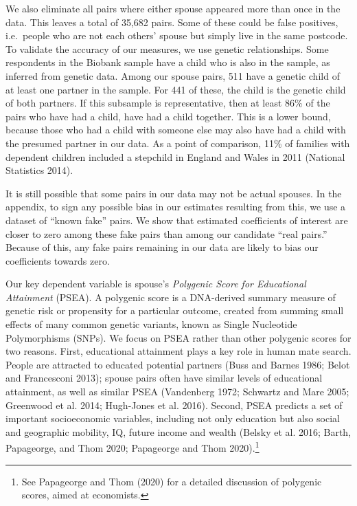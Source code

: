 \documentclass[
]{article}
\begin{document}
We also eliminate all pairs where either spouse appeared more than once
in the data. This leaves a total of 35,682 pairs. Some of
these could be false positives, i.e.~people who are not each others'
spouse but simply live in the same postcode. To validate the accuracy of
our measures, we use genetic relationships. Some respondents in the
Biobank sample have a child who is also in the sample, as inferred from
genetic data. Among our spouse pairs, 511 have a genetic
child of at least one partner in the sample. For 441 of
these, the child is the genetic child of both partners. If this
subsample is representative, then at least
86\% of the pairs who have had a
child, have had a child together. This is a lower bound, because those
who had a child with someone else may also have had a child with the
presumed partner in our data. As a point of comparison, 11\% of families
with dependent children included a stepchild in England and Wales in
2011 (National Statistics 2014).

It is still possible that some pairs in our data may not be actual spouses. In
the appendix, to sign any possible bias in our estimates resulting from this, we
use a dataset of ``known fake'' pairs. We show that estimated coefficients of
interest are closer to zero among these fake pairs than among our candidate
``real pairs.'' Because of this, any fake pairs remaining in our data are likely
to bias our coefficients towards zero.

Our key dependent variable is spouse's \emph{Polygenic Score for Educational
Attainment} (PSEA). A polygenic score is a DNA-derived summary measure
of genetic risk or propensity for a particular outcome, created from
summing small effects of many common genetic variants, known as Single
Nucleotide Polymorphisms (SNPs). We focus on PSEA rather than other
polygenic scores for two reasons. First, educational attainment plays a key role in
human mate search. People are attracted to educated potential partners
(Buss and Barnes 1986; Belot and Francesconi 2013); spouse pairs often have
similar levels of educational attainment, as well as similar PSEA
(Vandenberg 1972; Schwartz and Mare 2005; Greenwood et al. 2014; Hugh-Jones et al. 2016). Second, PSEA predicts a set of important socioeconomic
variables, including not only education but also social and geographic mobility,
IQ, future income and wealth (Belsky et al. 2016; Barth, Papageorge, and Thom 2020; Papageorge and Thom 2020).\footnote{See Papageorge and Thom (2020) for a detailed discussion of polygenic
  scores, aimed at economists.}
\end{document}

